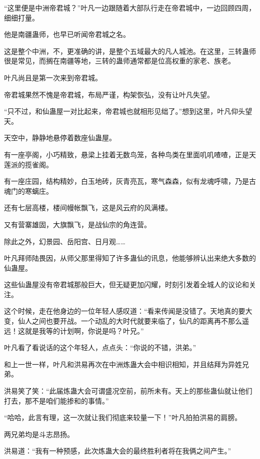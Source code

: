 
\begin{this_body}



“这里便是中洲帝君城？”叶凡一边跟随着大部队行走在帝君城中，一边回顾四周，细细打量。

他是南疆蛊师，也早已听闻帝君城之名。

这是整个中洲，不，更准确的讲，是整个五域最大的凡人城池。在这里，三转蛊师很是常见，而搁在南疆等地，三转的蛊师通常都是位高权重的家老、族老。

叶凡尚且是第一次来到帝君城。

帝君城果然不愧是帝君城，布局严谨，构架恢弘，没有让叶凡失望。

“只不过，和仙蛊屋一对比起来，帝君城也就相形见绌了。”想到这里，叶凡仰头望天。

天空中，静静地悬停着数座仙蛊屋。

有一座亭阁，小巧精致，悬梁上挂着无数鸟笼，各种鸟类在里面叽叽喳喳，正是天莲派的揽雀阁。

有一座庄园，结构精妙，白玉地砖，灰青亮瓦，寒气森森，似有龙魂呼啸，乃是古魂门的寒螭庄。

还有七层高楼，楼间幔帐飘飞，这是风云府的风满楼。

又有营寨雄固，大旗飘飞，是战仙宗的角连营。

除此之外，幻景园、岳阳宫、日月观……

叶凡拜师陆畏因，从师父那里得知了许多蛊仙的讯息，他能够辨认出来绝大多数的仙蛊屋。

这些仙蛊屋没有帝君城那般巨大，但无疑更加闪耀，时刻引发着全城人的议论和关注。

这个时候，走在他身边的一位年轻人感叹道：“看来传闻是没错了。天地真的要大变，仙人之间也要开战。一个动乱的大时代就要来临了，仙凡的距离再不那么遥远！这就是我等的计划啊，你说是吗？叶兄。”

叶凡看了看说话的这个年轻人，点点头：“你说的不错，洪弟。”

和上一世一样，叶凡和洪易再次在中洲炼蛊大会中相识相知，并且结拜为异姓兄弟。

洪易笑了笑：“此届炼蛊大会可谓盛况空前，前所未有。天上的那些蛊仙就让他们打去，那不是咱们能掺和的事情。”

“哈哈，此言有理，这一次就让我们彻底来较量一下！”叶凡拍拍洪易的肩膀。

两兄弟均是斗志昂扬。

洪易道：“我有一种预感，此次炼蛊大会的最终胜利者将在我俩之间产生。”


\end{this_body}
